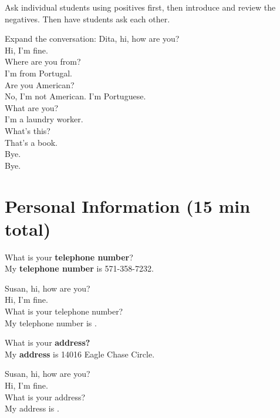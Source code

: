 Ask individual students using positives first, then introduce and review the negatives. Then have students ask each other.

Expand the conversation:
\ex
\dialt Dita, hi, how are you?\\
\dials Hi, I'm fine.\\
\dialt Where are you from?\\
\dials I'm from Portugal.\\
\dialt Are you American?\\
\dials No, I'm not American. I'm Portuguese.\\
\dialt What are you?\\
\dials I'm a laundry worker.\\
\dialt What's this?\\
\dials That's a book.\\
\dialt Bye.\\
\dials Bye.
\xe

\section{Personal Information (15 min total)}
\begin{framed}
\dialt What is your \textbf{telephone number}?\\
\hspace{0em}\phantom \dialt My \textbf{telephone number} is 571-358-7232.
\end{framed}
\ex
\dialt Susan, hi, how are you?\\
\dials Hi, I'm fine.\\
\dialt What is your telephone number?\\
\dials My telephone number is \underline{\hspace{2cm}}.\\
\xe

\begin{framed}
\dialt What is your \textbf{address?}\\
\hspace{0em}\phantom \dialt My \textbf{address} is 14016 Eagle Chase Circle.
\end{framed}
\ex
\dialt Susan, hi, how are you?\\
\dials Hi, I'm fine.\\
\dialt What is your address?\\
\dials My address is \underline{\hspace{3cm}}.\\
\xe

